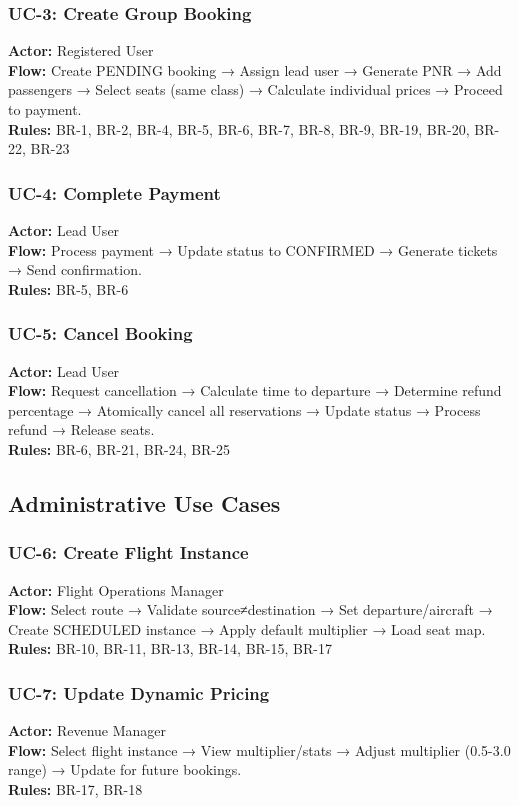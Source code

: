 \documentclass[12pt,a4paper,openany]{report}
\begin{document}
\subsubsection*{UC-3: Create Group Booking}
\textbf{Actor:} Registered User\\
\textbf{Flow:} Create PENDING booking → Assign lead user → Generate PNR → Add passengers → Select seats (same class) → Calculate individual prices → Proceed to payment.\\
\textbf{Rules:} BR-1, BR-2, BR-4, BR-5, BR-6, BR-7, BR-8, BR-9, BR-19, BR-20, BR-22, BR-23

\subsubsection*{UC-4: Complete Payment}
\textbf{Actor:} Lead User\\
\textbf{Flow:} Process payment → Update status to CONFIRMED → Generate tickets → Send confirmation.\\
\textbf{Rules:} BR-5, BR-6

\subsubsection*{UC-5: Cancel Booking}
\textbf{Actor:} Lead User\\
\textbf{Flow:} Request cancellation → Calculate time to departure → Determine refund percentage → Atomically cancel all reservations → Update status → Process refund → Release seats.\\
\textbf{Rules:} BR-6, BR-21, BR-24, BR-25

\subsection{Administrative Use Cases}

\subsubsection*{UC-6: Create Flight Instance}
\textbf{Actor:} Flight Operations Manager\\
\textbf{Flow:} Select route → Validate source≠destination → Set departure/aircraft → Create SCHEDULED instance → Apply default multiplier → Load seat map.\\
\textbf{Rules:} BR-10, BR-11, BR-13, BR-14, BR-15, BR-17

\subsubsection*{UC-7: Update Dynamic Pricing}
\textbf{Actor:} Revenue Manager\\
\textbf{Flow:} Select flight instance → View multiplier/stats → Adjust multiplier (0.5-3.0 range) → Update for future bookings.\\
\textbf{Rules:} BR-17, BR-18
\end{document}
